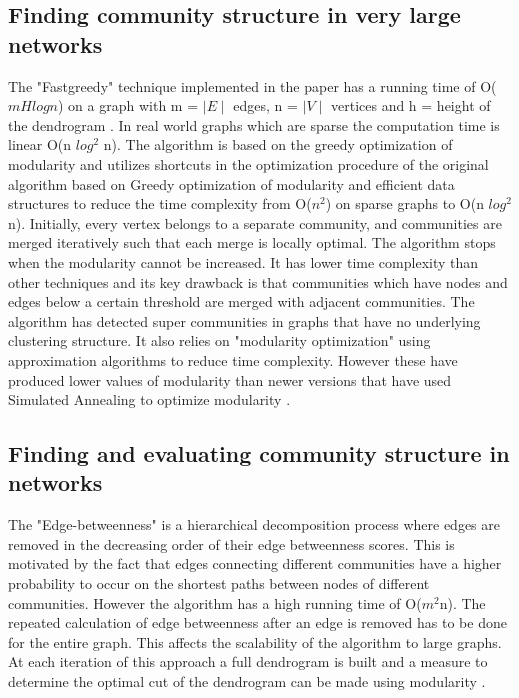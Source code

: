 \subsection{Finding community structure in very large networks}
The "Fastgreedy" technique implemented in the paper has a running time of O($mHlog n$) on a graph with m = $\mid E \mid$ edges, n = $\mid V \mid$ vertices and h = height of the dendrogram \cite{aps:25}. In real world graphs which are sparse the computation time is linear O(n $log^2$ n). The algorithm is based on the greedy optimization of modularity and utilizes shortcuts in the optimization procedure of the original algorithm based on Greedy optimization of modularity \cite{aps:30} and efficient data structures to reduce the time complexity from O($n^2$) on sparse graphs to O(n $log^2$ n). Initially, every vertex belongs to a separate community, and communities are merged iteratively such that each merge is locally optimal. The algorithm stops when the modularity cannot be increased. It has lower time complexity than other techniques and its key drawback is that communities which have nodes and edges below a certain threshold are merged with adjacent communities. The algorithm has detected super communities in graphs that have no underlying clustering structure. It also relies on "modularity optimization" using approximation algorithms to reduce time complexity. However these have produced lower values of modularity than newer versions that have used Simulated Annealing to optimize modularity \cite{aps:33}.\\

\subsection{Finding and evaluating community structure in networks}
The "Edge-betweenness" is a hierarchical decomposition process where edges are removed in the decreasing order of their edge betweenness scores. This is motivated by the fact that edges connecting different communities have a higher probability to occur on the shortest paths between nodes of different communities. However the algorithm has a high running time of O($m^2$n). The repeated calculation of edge betweenness after an edge is removed has to be done for the entire graph. This affects the scalability of the algorithm to large graphs. At each iteration of this approach a full dendrogram is built and a measure to determine the optimal cut of the dendrogram can be made using modularity \cite{aps:31} \cite{aps:32}.  

